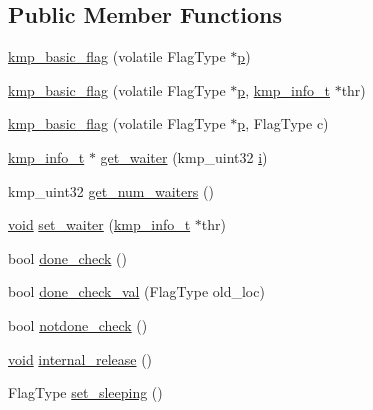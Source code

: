 \subsection*{Public Member Functions}
\begin{DoxyCompactItemize}
\item 
\hyperlink{classkmp__basic__flag_aa3f040aef2c063781419ab49285d4b6a}{kmp\-\_\-basic\-\_\-flag} (volatile Flag\-Type $\ast$\hyperlink{ittnotify__static_8h_ab7caea589d3ca96f9f11c78f10bff578}{p})
\item 
\hyperlink{classkmp__basic__flag_a94bd75692e97fbbf547981f74a19286b}{kmp\-\_\-basic\-\_\-flag} (volatile Flag\-Type $\ast$\hyperlink{ittnotify__static_8h_ab7caea589d3ca96f9f11c78f10bff578}{p}, \hyperlink{kmp_8h_a194859801fe16b326efe34501a37c30a}{kmp\-\_\-info\-\_\-t} $\ast$thr)
\item 
\hyperlink{classkmp__basic__flag_a74d7dcf67d8fd1d67848a14eeb534654}{kmp\-\_\-basic\-\_\-flag} (volatile Flag\-Type $\ast$\hyperlink{ittnotify__static_8h_ab7caea589d3ca96f9f11c78f10bff578}{p}, Flag\-Type c)
\item 
\hyperlink{kmp_8h_a194859801fe16b326efe34501a37c30a}{kmp\-\_\-info\-\_\-t} $\ast$ \hyperlink{classkmp__basic__flag_a9bda9152e187ebdd45ddce7fb4e70bbf}{get\-\_\-waiter} (kmp\-\_\-uint32 \hyperlink{kmp__stub_8c_a08582ce460e3d5e1cf0b7fea017d608e}{i})
\item 
kmp\-\_\-uint32 \hyperlink{classkmp__basic__flag_ab1d3109c504f00e97e72e2ce7c109781}{get\-\_\-num\-\_\-waiters} ()
\item 
\hyperlink{ittnotify__static_8h_af941d56e55e3c5465135b60c4d6343ed}{void} \hyperlink{classkmp__basic__flag_a594260bd4ea158ba17bf17a9358ef3d4}{set\-\_\-waiter} (\hyperlink{kmp_8h_a194859801fe16b326efe34501a37c30a}{kmp\-\_\-info\-\_\-t} $\ast$thr)
\item 
bool \hyperlink{classkmp__basic__flag_a2478619a6645b7d93cacadd3843149a8}{done\-\_\-check} ()
\item 
bool \hyperlink{classkmp__basic__flag_a4c3c9eb8b025aa26b047b96de2331286}{done\-\_\-check\-\_\-val} (Flag\-Type old\-\_\-loc)
\item 
bool \hyperlink{classkmp__basic__flag_aa3981ca4f1534af0c3302a4950c7b51c}{notdone\-\_\-check} ()
\item 
\hyperlink{ittnotify__static_8h_af941d56e55e3c5465135b60c4d6343ed}{void} \hyperlink{classkmp__basic__flag_aa238982a2c6f8357f7e98ebb304a18d1}{internal\-\_\-release} ()
\item 
Flag\-Type \hyperlink{classkmp__basic__flag_adad239a48ed436a6e109fbb15c17306c}{set\-\_\-sleeping} ()

\end{DoxyCompactItemize}
